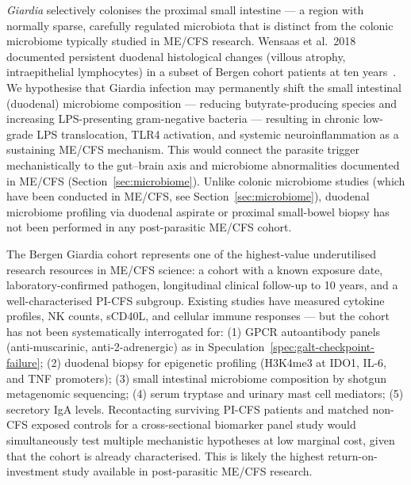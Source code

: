 \begin{open_question}
\label{oq:duodenal-microbiome}
\emph{Giardia} selectively colonises the proximal small intestine --- a region with normally sparse, carefully regulated microbiota that is distinct from the colonic microbiome typically studied in ME/CFS research. Wensaas et al.\ 2018 documented persistent duodenal histological changes (villous atrophy, intraepithelial lymphocytes) in a subset of Bergen cohort patients at ten years~\cite{Wensaas2018giardia10yr}. We hypothesise that Giardia infection may permanently shift the small intestinal (duodenal) microbiome composition --- reducing butyrate-producing species and increasing LPS-presenting gram-negative bacteria --- resulting in chronic low-grade LPS translocation, TLR4 activation, and systemic neuroinflammation as a sustaining ME/CFS mechanism. This would connect the parasite trigger mechanistically to the gut--brain axis and microbiome abnormalities documented in ME/CFS (Section~\ref{sec:microbiome}). Unlike colonic microbiome studies (which have been conducted in ME/CFS, see Section~\ref{sec:microbiome}), duodenal microbiome profiling via duodenal aspirate or proximal small-bowel biopsy has not been performed in any post-parasitic ME/CFS cohort.
\end{open_question}

\begin{open_question}
\label{oq:bergen-biobank-recontact}
The Bergen Giardia cohort represents one of the highest-value underutilised research resources in ME/CFS science: a cohort with a known exposure date, laboratory-confirmed pathogen, longitudinal clinical follow-up to 10 years, and a well-characterised PI-CFS subgroup. Existing studies have measured cytokine profiles, NK counts, sCD40L, and cellular immune responses --- but the cohort has not been systematically interrogated for: (1) GPCR autoantibody panels (anti-muscarinic, anti-\textbeta{}2-adrenergic) as in Speculation~\ref{spec:galt-checkpoint-failure}; (2) duodenal biopsy for epigenetic profiling (H3K4me3 at IDO1, IL-6, and TNF\textalpha{} promoters); (3) small intestinal microbiome composition by shotgun metagenomic sequencing; (4) serum tryptase and urinary mast cell mediators; (5) secretory IgA levels. Recontacting surviving PI-CFS patients and matched non-CFS exposed controls for a cross-sectional biomarker panel study would simultaneously test multiple mechanistic hypotheses at low marginal cost, given that the cohort is already characterised. This is likely the highest return-on-investment study available in post-parasitic ME/CFS research.
\end{open_question}

